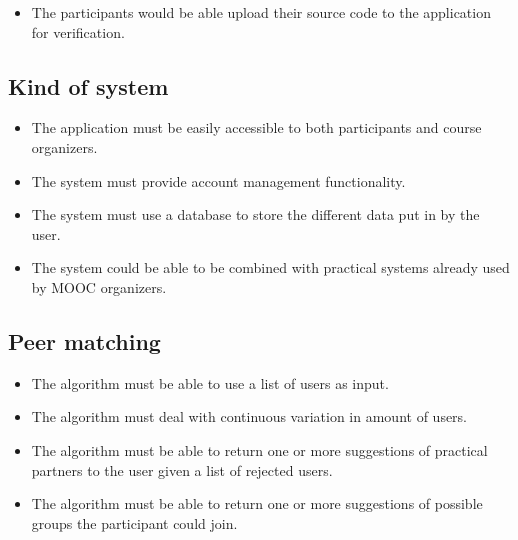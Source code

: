 \begin{itemize}
\item The participants would be able upload their source code to the application for verification.
\end{itemize}

\subsection*{Kind of system}

\begin{itemize}
\item The application must be easily accessible to both participants and course organizers.
\item The system must provide account management functionality.
\item The system must use a database to store the different data put in by the user.
\end{itemize}


\begin{itemize}
\item The system could be able to be combined with practical systems already used by MOOC organizers.
\end{itemize}


\subsection*{Peer matching}
\begin{itemize}
\item The algorithm must be able to use a list of users as input.
\item The algorithm must deal with continuous variation in amount of users.
\item The algorithm must be able to return one or more suggestions of practical partners to the user given a list of rejected users.
\item The algorithm must be able to return one or more suggestions of possible groups the participant could join.
\end{itemize}

